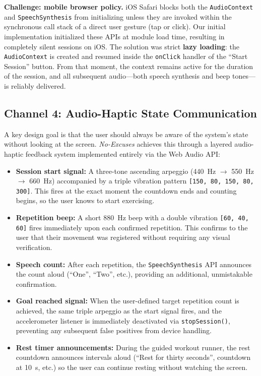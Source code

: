 \documentclass[11pt]{article}
\begin{document}
\textbf{Challenge: mobile browser policy.} iOS Safari blocks both the \texttt{AudioContext} and \texttt{SpeechSynthesis} from initializing unless they are invoked within the synchronous call stack of a direct user gesture (tap or click). Our initial implementation initialized these APIs at module load time, resulting in completely silent sessions on iOS. The solution was strict \textbf{lazy loading}: the \texttt{AudioContext} is created and resumed inside the \texttt{onClick} handler of the ``Start Session'' button. From that moment, the context remains active for the duration of the session, and all subsequent audio—both speech synthesis and beep tones—is reliably delivered.

\subsection{Channel 4: Audio-Haptic State Communication}

A key design goal is that the user should always be aware of the system's state without looking at the screen. \textit{No-Excuses} achieves this through a layered audio-haptic feedback system implemented entirely via the Web Audio API:

\begin{itemize}
  \item \textbf{Session start signal:} A three-tone ascending arpeggio (440~Hz $\to$ 550~Hz $\to$ 660~Hz) accompanied by a triple vibration pattern \texttt{[150, 80, 150, 80, 300]}. This fires at the exact moment the countdown ends and counting begins, so the user knows to start exercising.
  \item \textbf{Repetition beep:} A short 880~Hz beep with a double vibration \texttt{[60, 40, 60]} fires immediately upon each confirmed repetition. This confirms to the user that their movement was registered without requiring any visual verification.
  \item \textbf{Speech count:} After each repetition, the \texttt{SpeechSynthesis} API announces the count aloud (``One'', ``Two'', etc.), providing an additional, unmistakable confirmation.
  \item \textbf{Goal reached signal:} When the user-defined target repetition count is achieved, the same triple arpeggio as the start signal fires, and the accelerometer listener is immediately deactivated via \texttt{stopSession()}, preventing any subsequent false positives from device handling.
  \item \textbf{Rest timer announcements:} During the guided workout runner, the rest countdown announces intervals aloud (``Rest for thirty seconds'', countdown at 10~s, etc.) so the user can continue resting without watching the screen.
\end{itemize}
\end{document}
